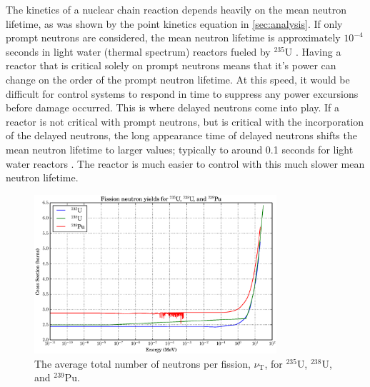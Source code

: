 The kinetics of a nuclear chain reaction depends heavily on the mean neutron lifetime, as was shown by the point kinetics equation in \ref{sec:analysis}.  If only prompt neutrons are considered, the mean neutron lifetime is approximately $10^{-4}$ seconds in light water (thermal spectrum) reactors fueled by $^{235}$U \cite{duderstadt}.  Having a reactor that is critical solely on prompt neutrons means that it's power can change on the order of the prompt neutron lifetime.  At this speed, it would be difficult for control systems to respond in time to suppress any power excursions before damage occurred.  This is where delayed neutrons come into play.  If a reactor is not critical with prompt neutrons, but is critical with the incorporation of the delayed neutrons, the long appearance time of delayed neutrons shifts the mean neutron lifetime to larger values; typically to around 0.1 seconds for light water reactors \cite{duderstadt}.  The reactor is much easier to control with this much slower mean neutron lifetime.


\begin{figure}[h!]
  \centering
    \includegraphics[width=0.8\textwidth]{graphics/nu_compare.eps}
     \caption{The average total number of neutrons per fission, $\nu_\mathrm{T}$, for $^{235}$U, $^{238}$U, and $^{239}$Pu. \label{nu_compare}}
\end{figure}

